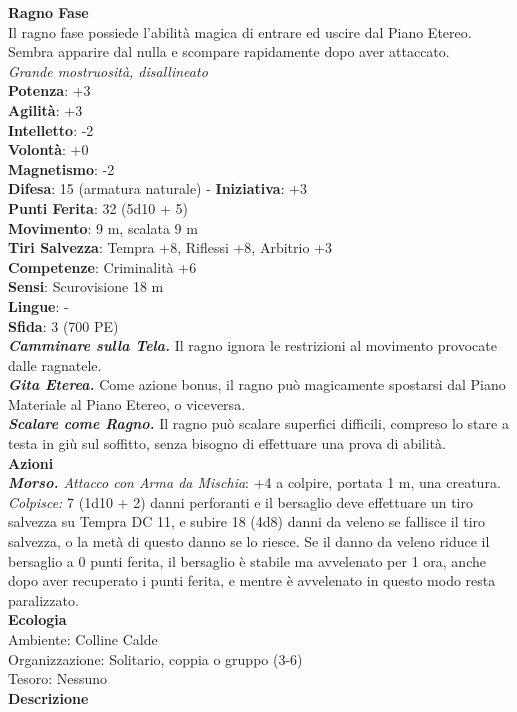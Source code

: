 \begin{multicols}{2}
\medskip\textbf{Ragno Fase}\\
Il ragno fase possiede l'abilità magica di entrare ed uscire dal Piano Etereo. Sembra apparire dal nulla e scompare rapidamente dopo aver attaccato.\\
\emph{Grande mostruosità, disallineato}\\
\textbf{Potenza}: +3\\
\textbf{Agilità}: +3\\
\textbf{Intelletto}: -2\\
\textbf{Volontà}: +0\\
\textbf{Magnetismo}: -2\\
\textbf{Difesa}: 15 (armatura naturale) - \textbf{Iniziativa}: +3\\
\textbf{Punti Ferita}: 32 (5d10 + 5)\\
\textbf{Movimento}: 9 m, scalata 9 m\\
\textbf{Tiri Salvezza}: Tempra +8, Riflessi +8, Arbitrio +3 \\
\textbf{Competenze}: Criminalità +6\\
\textbf{Sensi}: Scurovisione 18 m\\
\textbf{Lingue}: -\\
\textbf{Sfida}: 3 (700 PE)\smallskip\\
\emph{\textbf{Camminare sulla Tela.}} Il ragno ignora le restrizioni al movimento provocate dalle ragnatele.\\
\emph{\textbf{Gita Eterea.}} Come azione bonus, il ragno può magicamente spostarsi dal Piano Materiale al Piano Etereo, o viceversa.\\
\emph{\textbf{Scalare come Ragno.}} Il ragno può scalare superfici difficili, compreso lo stare a testa in giù sul soffitto, senza bisogno di effettuare una prova di abilità. \\
\smallskip\textbf{Azioni}\\
\emph{\textbf{Morso.} Attacco con Arma da Mischia}: +4 a colpire, portata 1 m, una creatura.\\
\emph{Colpisce:} 7 (1d10 + 2) danni perforanti e il bersaglio deve effettuare un tiro salvezza su Tempra DC 11, e subire 18 (4d8) danni da veleno se fallisce il tiro salvezza, o la metà di questo danno se lo riesce. Se il danno da veleno riduce il bersaglio a 0 punti ferita, il bersaglio è stabile ma avvelenato per 1 ora, anche dopo aver recuperato i punti ferita, e mentre è avvelenato in questo modo resta paralizzato.\\
\textbf{Ecologia}\\
Ambiente: Colline Calde\\
Organizzazione: Solitario, coppia o gruppo (3-6)\\
Tesoro: Nessuno\\
\textbf{Descrizione}\\


\end{multicols}
